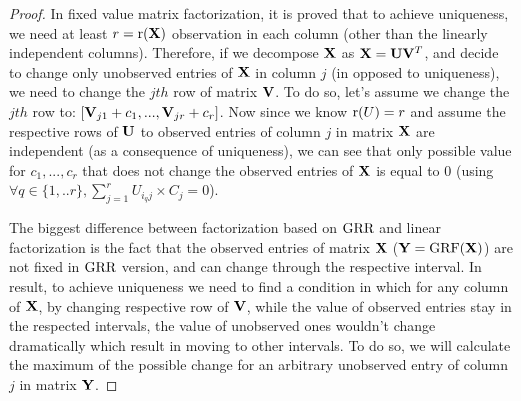 \documentclass{article}
\newcommand{\sameer}[1]{\todo[color=blue!20]{\textbf{s:} #1}{}}
\begin{document}
\begin{thm:thm}
\begin{proof}
 In fixed value matrix factorization, it is proved that to achieve uniqueness, we need at least $r=\mathrm{r}(\mathbf{X})$ observation in each column (other than the linearly independent columns). Therefore, if we decompose $\mathbf{X}$ as $\mathbf{X}=\mathbf{U}\mathbf{V}^T$, and decide to change only unobserved entries of $\mathbf{X}$ in column $j$ (in opposed to uniqueness), we need to change the $jth$ row of matrix $\mathbf{V}$. To do so, let's assume we change the $jth$ row to: $
[\mathbf{V}_{j1}+c_1,...,\mathbf{V}_{jr}+c_r]
$.
Now since we know $\mathrm{r}(U)=r$ and assume the respective rows of $\mathbf{U}$ to observed entries of column $j$ in matrix $\mathbf{X}$ are independent (as a consequence of uniqueness), we can see that only possible value for $c_1,..., c_r$ that does not change the observed entries of $\mathbf{X}$ is equal to $0$ (using $\forall q\in\{1,..r\}, \sum_{j=1}^{r}U_{i_qj}\times C_j =0 $). %

The biggest difference between factorization based on $\text{GRR}$ and linear factorization is the fact that the observed entries of matrix $\mathbf{X}$ ($\mathbf{Y}=\text{GRF}(\mathbf{X})$) are not fixed in $\text{GRR}$ version, and can change through the respective interval. In result, to achieve uniqueness we need to find a condition in which for any column of $\mathbf{X}$, by changing respective row of $\mathbf{V}$, while the value of observed entries stay in the respected intervals, the value of unobserved ones wouldn't change dramatically which result in moving to other intervals. To do so, we will calculate the maximum of the possible change for an arbitrary unobserved entry of column $j$ in matrix $\mathbf{Y}$.


\end{proof}
\end{thm:thm}
\end{document}
